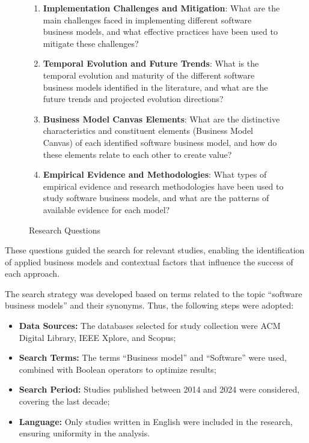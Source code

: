 \documentclass[journal]{IEEEtran}
\begin{document}
\begin{figure}[!htb]
\begin{mdframed}[roundcorner=7pt,backgroundcolor=gray!25]
\begin{enumerate}[label=\textbf{RQ\arabic*.}]
        \item \textbf{Implementation Challenges and Mitigation}: What are the main challenges faced in implementing different software business models, and what effective practices have been used to mitigate these challenges?\label{rq:07}
        \item \textbf{Temporal Evolution and Future Trends}: What is the temporal evolution and maturity of the different software business models identified in the literature, and what are the future trends and projected evolution directions?\label{rq:08}
        \item \textbf{Business Model Canvas Elements}: What are the distinctive characteristics and constituent elements (Business Model Canvas) of each identified software business model, and how do these elements relate to each other to create value?\label{rq:09}
        \item \textbf{Empirical Evidence and Methodologies}: What types of empirical evidence and research methodologies have been used to study software business models, and what are the patterns of available evidence for each model?\label{rq:10}
    \end{enumerate}
    \end{mdframed}
    \caption{Research Questions}
    \label{fig:RQs}
\end{figure}

These questions guided the search for relevant studies, enabling the identification of applied business models and contextual factors that influence the success of each approach.

The search strategy was developed based on terms related to the topic ``software business models'' and their synonyms. Thus, the following steps were adopted:
\begin{itemize}
    \item \textbf{Data Sources:} The databases selected for study collection were ACM Digital Library, IEEE Xplore, and Scopus;
    \item \textbf{Search Terms:} The terms ``Business model'' and ``Software'' were used, combined with Boolean operators to optimize results;
    \item \textbf{Search Period:} Studies published between 2014 and 2024 were considered, covering the last decade;
    \item \textbf{Language:} Only studies written in English were included in the research, ensuring uniformity in the analysis.
\end{itemize}
\end{document}

